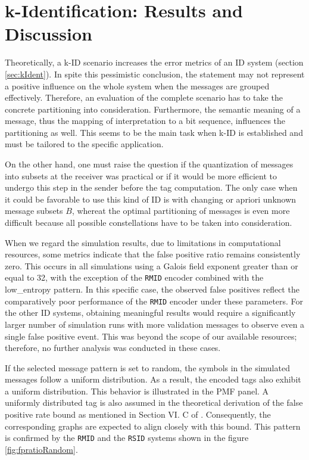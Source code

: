 \documentclass[english,BCOR=4mm,cdfont=false]{tudscrreprt} %
\begin{document}
\section{k-Identification: Results and Discussion}
\label{sec:FindingskID}
Theoretically, a k-ID scenario increases the error metrics of an ID system (section \ref{sec:kIdent}). In spite this pessimistic conclusion, the statement may not represent a positive influence on the whole system when the messages are grouped effectively. Therefore, an evaluation of the complete scenario has to take the concrete partitioning into consideration. Furthermore, the semantic meaning of a message, thus the mapping of interpretation to a bit sequence, influences the partitioning as well. This seems to be the main task when k-ID is established and must be tailored to the specific application. 

On the other hand, one must raise the question if the quantization of messages into subsets at the receiver was practical or if it would be more efficient to undergo this step in the sender before the tag computation. The only case when it could be favorable to use this kind of ID is with changing or apriori unknown message subsets $B$, whereat the optimal partitioning of messages is even more difficult because all possible constellations have to be taken into consideration.

When we regard the simulation results, due to limitations in computational resources, some metrics indicate that the false positive ratio remains consistently zero. This occurs in all simulations using a Galois field exponent greater than or equal to 32, with the exception of the \texttt{RMID} encoder combined with the low\_entropy pattern. In this specific case, the observed false positives reflect the comparatively poor performance of the \texttt{RMID} encoder under these parameters. For the other ID systems, obtaining meaningful results would require a significantly larger number of simulation runs with more validation messages to observe even a single false positive event. This was beyond the scope of our available resources; therefore, no further analysis was conducted in these cases.

If the selected message pattern is set to random, the symbols in the simulated messages follow a uniform distribution. As a result, the encoded tags also exhibit a uniform distribution. This behavior is illustrated in the PMF panel. A uniformly distributed tag is also assumed in the theoretical derivation of the false positive rate bound as mentioned in Section VI. C of \cite{ID_Codes_Topical_Review}. Consequently, the corresponding graphs are expected to align closely with this bound. This pattern is confirmed by the \texttt{RMID} and the \texttt{RSID} systems shown in the figure \ref{fig:fpratioRandom}.
\end{document}
